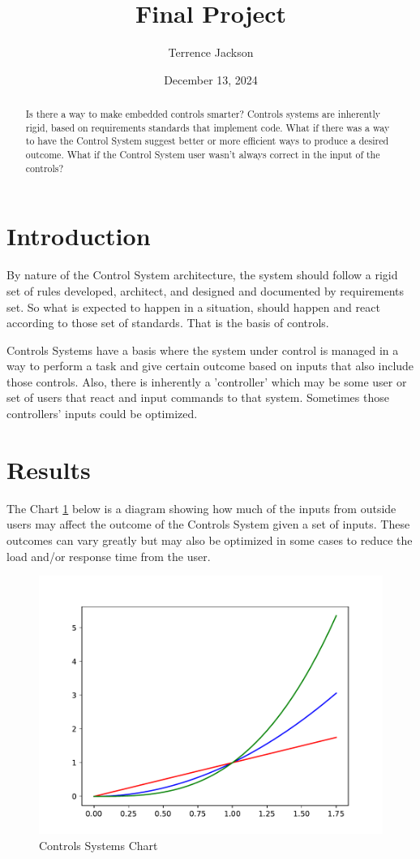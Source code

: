 \documentclass{IEEEtran}
\date{December 13, 2024}
\title{Final Project}
\author{Terrence Jackson}
\begin{document}
\maketitle


\begin{abstract}
Is there a way to make embedded controls smarter? Controls systems are inherently rigid, based on requirements standards that implement code.  What if there was a way to have the Control System suggest better or more efficient ways to produce  a desired outcome.  What if the Control System user wasn't always correct in the input of the controls?
\end{abstract}

\section{Introduction}

By nature of the Control System architecture, the system should follow a rigid set of rules developed, architect,  and designed and documented by requirements set.  So what is expected to happen in a situation, should happen and react according to those set of standards. That is the basis of controls. 

Controls Systems have a basis where the system under control is managed in a way to perform a task and give certain outcome based on inputs that also include those controls.  Also, there is inherently a 'controller' which may be some user or set of users that react and input commands to that system.  Sometimes those controllers' inputs could be optimized.  


\section{Results}

The Chart \ref{fig:graph} below is a diagram showing how much of the inputs from outside users may affect the outcome of the Controls System given a set of inputs. These outcomes can vary greatly but may also be optimized in some cases to reduce the load and/or response time from the user. 

\begin{figure}[h]
    \centering
    \includegraphics[width=0.65\linewidth]{Midterm_Jackson.pdf}
    \caption{\label{fig:graph} Controls Systems Chart}
\end{figure}
\end{document}
